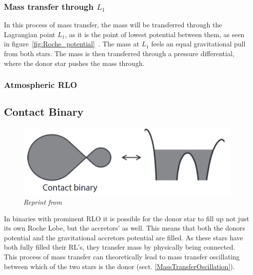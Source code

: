 \documentclass[12pt, a4paper]{article}
\begin{document}
        \subsubsection{Mass transfer through $L_1$} \label{L1MassTransfer}

        In this process of mass transfer, the mass will be transferred through the Lagrangian point $L_1$, as it is the point of lowest potential between them, as seen in figure~\ref{fig:Roche_potential}~\parencite{TaurisvandenHeuvel+2023}. The mass at $L_1$ feels an equal gravitational pull from both stars. The mass is then transferred through a pressure differential, where the donor star pushes the mass through. 

        \subsubsection{Atmospheric RLO} \label{atmosphericRLO}

        \subsection{\centering Contact Binary}

        \begin{figure}[H]
            \centering
            \includegraphics[scale = .4]{Figs/reused-figs/Tauris_ContactBinary.png}

            \caption{\textit{Reprint from~\parencite{TaurisvandenHeuvel+2023}}}
            \label{ContactBinaryRL}
        \end{figure}

        In binaries with prominent RLO it is possible for the donor star to fill up not just its own Roche Lobe, but the accretors' as well. This means that both the donors  potential and the gravitational accretors potential are filled. \parencite{TaurisvandenHeuvel+2023} As these stars have both fully filled their RL's, they transfer mass by physically being connected. This process of mass transfer can theoretically lead to mass transfer oscillating between which of the two stars is the donor (sect. \ref{MassTransferOscillation}). 
        
\end{document}
